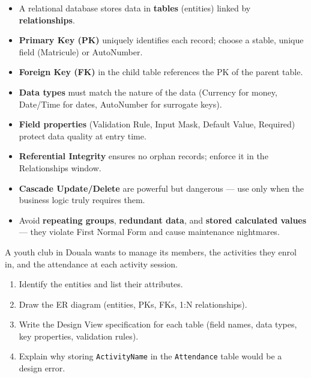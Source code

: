\documentclass[11pt]{article}
\begin{document}
\begin{aretenir}
\begin{itemize}
    \item A relational database stores data in \textbf{tables} (entities) linked by \textbf{relationships}.
    \item \textbf{Primary Key (PK)} uniquely identifies each record; choose a stable, unique field (Matricule) or AutoNumber.
    \item \textbf{Foreign Key (FK)} in the child table references the PK of the parent table.
    \item \textbf{Data types} must match the nature of the data (Currency for money, Date/Time for dates, AutoNumber for surrogate keys).
    \item \textbf{Field properties} (Validation Rule, Input Mask, Default Value, Required) protect data quality at entry time.
    \item \textbf{Referential Integrity} ensures no orphan records; enforce it in the Relationships window.
    \item \textbf{Cascade Update/Delete} are powerful but dangerous — use only when the business logic truly requires them.
    \item Avoid \textbf{repeating groups}, \textbf{redundant data}, and \textbf{stored calculated values} — they violate First Normal Form and cause maintenance nightmares.
\end{itemize}
\end{aretenir}

\begin{exercice}
A youth club in Douala wants to manage its members, the activities they enrol in, and the attendance at each activity session.
\begin{enumerate}
    \item Identify the entities and list their attributes.
    \item Draw the ER diagram (entities, PKs, FKs, 1:N relationships).
    \item Write the Design View specification for each table (field names, data types, key properties, validation rules).
    \item Explain why storing \texttt{ActivityName} in the \texttt{Attendance} table would be a design error.
\end{enumerate}
\end{exercice}
\end{document}
